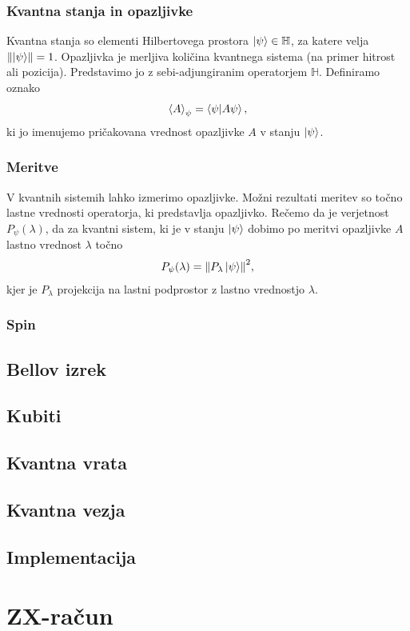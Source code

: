 \documentclass[mat1]{fmfdelo}
\newcommand{\Hb}{\mathbb H}
\begin{document}
\subsubsection{Kvantna stanja in opazljivke}
Kvantna stanja so elementi Hilbertovega prostora \(\ket\psi\in\Hb\), za katere velja \(\norm{\ket\psi} = 1\). Opazljivka je merljiva količina kvantnega sistema (na primer hitrost ali pozicija). Predstavimo jo z sebi-adjungiranim operatorjem \(\Hb\). Definiramo oznako
\begin{align*}
    \ev{A}_\psi = \braket{\psi}{A\psi},
\end{align*}
ki jo imenujemo pričakovana vrednost opazljivke \(A\) v stanju \(\ket\psi\).
\subsubsection{Meritve}
V kvantnih sistemih lahko izmerimo opazljivke. Možni rezultati meritev so točno lastne vrednosti operatorja, ki predstavlja opazljivko. Rečemo da je verjetnost \(P_\psi(\lambda)\), da za kvantni sistem, ki je v stanju \(\ket\psi\) dobimo po meritvi opazljivke \(A\) lastno vrednost \(\lambda\) točno 
\begin{align*}
    P_\psi(\lambda) = \norm{P_\lambda \ket\psi}^2,
\end{align*}
kjer je \(P_\lambda\) projekcija na lastni podprostor z lastno vrednostjo \(\lambda\).
\subsubsection{Spin}
\subsection{Bellov izrek}
\subsection{Kubiti}
\subsection{Kvantna vrata}
\subsection{Kvantna vezja}
\subsection{Implementacija}
\section{ZX-račun}
\end{document}
